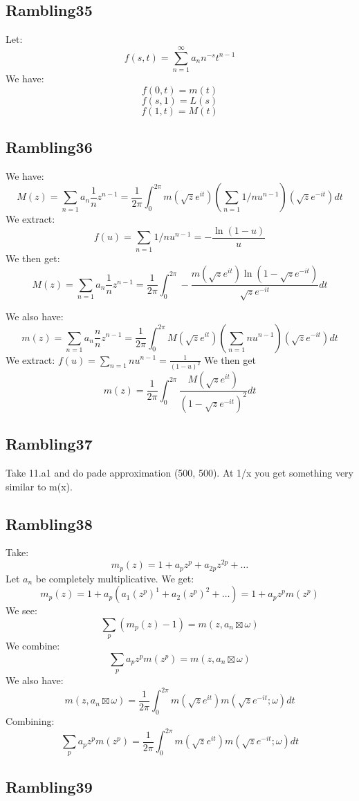 \documentclass[a4paper]{amsart}
\begin{document}
\subsection{Rambling35}
Let: 
$$f(s, t) = \sum_{n = 1}^\infty a_n n^{-s} t^{n - 1}$$
We have: 
$$f(0, t) = m(t)$$
$$f(s, 1) = L(s)$$
$$f(1, t) = M(t)$$


\subsection{Rambling36}
We have:
$$M(z) = \sum_{n = 1} a_n \frac{1}{n} z^{n - 1} = \frac{1}{2\pi} \int_0^{2\pi} m(\sqrt{z}e^{it}) (\sum_{n = 1} 1/n u^{n - 1})(\sqrt{z}e^{-it}) dt$$
We extract:
$$f(u) = \sum_{n = 1} 1/n u^{n - 1} = -\frac{\ln(1 - u)}{u}$$
We then get:
$$M(z) = \sum_{n = 1} a_n \frac{1}{n} z^{n - 1} = \frac{1}{2\pi} \int_0^{2\pi} -\frac{m(\sqrt{z}e^{it})\ln(1 - \sqrt{z}e^{-it})}{\sqrt{z}e^{-it}} dt$$

We also have:
$$m(z) = \sum_{n = 1} a_n \frac{n}{n} z^{n - 1} = \frac{1}{2\pi} \int_0^{2\pi} M(\sqrt{z}e^{it}) (\sum_{n = 1} n u^{n - 1})(\sqrt{z}e^{-it}) dt$$
We extract:
$f(u) = \sum_{n = 1} n u^{n - 1} = \frac{1}{(1 - u)^2}$
We then get
$$m(z) = \frac{1}{2\pi} \int_0^{2\pi} \frac{M(\sqrt{z}e^{it})}{(1 - \sqrt{z}e^{-it})^2} dt$$


\subsection{Rambling37}
Take 11.a1 and do pade approximation (500, 500). At 1/x you get something very similar to m(x).


\subsection{Rambling38}
Take:
$$m_p(z) = 1 + a_p z^p + a_{2p} z^{2p} + \ldots$$
Let $a_n$ be completely multiplicative. We get:
$$m_p(z) = 1 + a_p (a_1 (z^p)^1 + a_{2} (z^{p})^2 + \ldots) = 1 + a_p z^p m(z^p)$$
We see: 
$$\sum_p (m_p(z) - 1) = m(z, a_n \boxtimes \omega)$$
We combine:
$$\sum_p a_p z^p m(z^p) = m(z, a_n \boxtimes \omega)$$
We also have:
$$m(z, a_n \boxtimes \omega) = \frac{1}{2\pi} \int_0^{2\pi} m(\sqrt{z} e^{it}) m(\sqrt{z} e^{-it}; \omega)dt$$
Combining:
$$\sum_p a_p z^p m(z^p) = \frac{1}{2\pi} \int_0^{2\pi} m(\sqrt{z} e^{it}) m(\sqrt{z} e^{-it}; \omega)dt$$


\subsection{Rambling39}
\end{document}
